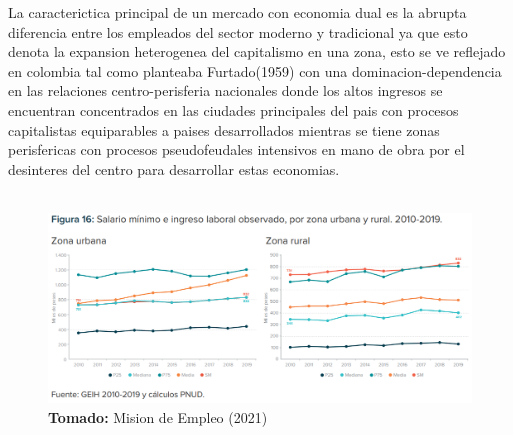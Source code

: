\documentclass[12pt,letterpaper]{book}
\newcommand*{\captionsource}[2]{%
    \textbf{\\Tomado:} #2%
  }%
\begin{document}
\begin{flushleft}

La caracterictica principal de un mercado con economia dual es la abrupta diferencia entre los empleados del sector moderno y tradicional ya que esto denota
la expansion heterogenea del capitalismo en una zona, esto se ve reflejado en colombia tal como planteaba Furtado(1959) con una dominacion-dependencia en las relaciones centro-perisferia nacionales
donde los altos ingresos se encuentran concentrados en las ciudades principales del pais con procesos capitalistas equiparables a paises desarrollados  mientras 
se tiene zonas perisfericas con procesos pseudofeudales intensivos en mano de obra por el desinteres del centro para desarrollar estas economias.\\ 
~\\
\begin{figure}
    \centering
    \includegraphics[width=\linewidth]{ingcentro-perisferia.png}
    \captionsource{Caption}{Mision de Empleo (2021)}
\end{figure}


\end{flushleft}
\end{document}
